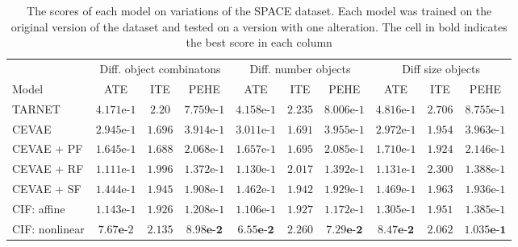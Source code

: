 \documentclass{report}
\begin{document}
\begin{appendices}
\begin{table}[h]
    \centering
    \begin{adjustbox}{center}
    \begin{tabular}{l||c|c|c||c|c|c||c|c|c|}
        & \multicolumn{3}{|c||}{Diff. object combinatons} & \multicolumn{3}{|c||}{Diff. number objects} & \multicolumn{3}{|c|}{Diff size objects} \\ 
        Model & ATE & ITE & PEHE & ATE & ITE & PEHE & ATE & ITE & PEHE \\
        \hline \hline
        TARNET &  $4.171\text{e-}1$ & $2.20$ & $7.759\text{e-}1$ & $4.158\text{e-}1$ & $2.235$ & $8.006\text{e-}1$ & $4.816\text{e-}1$ & $2.706$ & $8.755\text{e-}1$ \\
        \hline
        CEVAE & $2.945\text{e-}1$ & $1.696$ & $3.914\text{e-}1$ & $3.011\text{e-}1$ & $\mathbf{1.691}$ & $3.955\text{e-}1$ & $2.972\text{e-}1$ & $1.954$ & $3.963\text{e-}1$ \\
        \hline
        CEVAE + PF & $1.645\text{e-}1$ & $\mathbf{1.688}$ & $2.068\text{e-}1$ & $1.657\text{e-}1$ & $\mathbf{1.695}$ & $2.085\text{e-}1$ & $1.710\text{e-}1$ & $\mathbf{1.924}$ & $2.146\text{e-}1$ \\
        \hline
        CEVAE + RF & $1.111\text{e-}1$ & $1.996$ & $1.372\text{e-}1$ & $1.130\text{e-}1$ & $2.017$ & $1.392\text{e-}1$ & $1.131\text{e-}1$ & $2.300$ & $1.388\text{e-}1$ \\
        \hline 
        CEVAE + SF & $1.444\text{e-}1$ & $1.945$ & $1.908\text{e-}1$ & $1.462\text{e-}1$ & $1.942$ & $1.929\text{e-}1$ & $1.469\text{e-}1$ & $1.963$ & $1.936\text{e-}1$\\ 
        \hline
        CIF: affine & $1.143\text{e-}1$ & $1.926$ & $1.208\text{e-}1$ & $1.106\text{e-}1$ & $1.927$ & $1.172\text{e-}1$ & $1.305\text{e-}1$ & $1.951$ & $1.385\text{e-}1$ \\
        \hline
        CIF: nonlinear & \textbf{$\mathbf{7.67\text{e-}}2$} & $2.135$ & \textbf{$\mathbf{8.98\text{e-}2}$} & \textbf{$\mathbf{6.55\text{e-}2}$} & $2.260$ & \textbf{$\mathbf{7.29\text{e-}2}$} & \textbf{$\mathbf{8.47\text{e-}2}$} & $2.062$ & \textbf{$\mathbf{1.035\text{e-}1}$} \\

    \end{tabular}
    \end{adjustbox}
    \caption{The scores of each model on variations of the SPACE dataset. Each model was trained on the original version of the dataset and tested on a version with one alteration. The cell in bold indicates the best score in each column}
    \label{tab:results_experiments_space}
\end{table}

\end{appendices}
\end{document}
